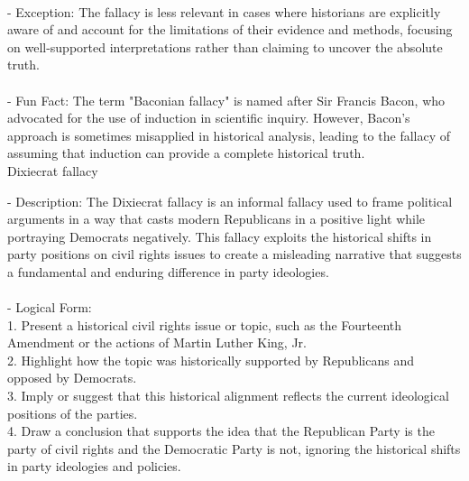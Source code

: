 \documentclass[a4paper,12pt,single,pdftex]{scrartcl}
\begin{document}
    
      
    \\

    
      - Exception: The fallacy is less relevant in cases where historians are explicitly aware of and account for the limitations of their evidence and methods, focusing on well-supported interpretations rather than claiming to uncover the absolute truth.
    \\

    
      
    \\

    
      - Fun Fact: The term "Baconian fallacy" is named after Sir Francis Bacon, who advocated for the use of induction in scientific inquiry. However, Bacon's approach is sometimes misapplied in historical analysis, leading to the fallacy of assuming that induction can provide a complete historical truth.
    \\

  

Dixiecrat fallacy
    
      - Description: The Dixiecrat fallacy is an informal fallacy used to frame political arguments in a way that casts modern Republicans in a positive light while portraying Democrats negatively. This fallacy exploits the historical shifts in party positions on civil rights issues to create a misleading narrative that suggests a fundamental and enduring difference in party ideologies.
    \\

    
      
    \\

    
      - Logical Form:
    \\

    
        1. Present a historical civil rights issue or topic, such as the Fourteenth Amendment or the actions of Martin Luther King, Jr.
    \\

    
        2. Highlight how the topic was historically supported by Republicans and opposed by Democrats.
    \\

    
        3. Imply or suggest that this historical alignment reflects the current ideological positions of the parties.
    \\

    
        4. Draw a conclusion that supports the idea that the Republican Party is the party of civil rights and the Democratic Party is not, ignoring the historical shifts in party ideologies and policies.
    \\
\end{document}
